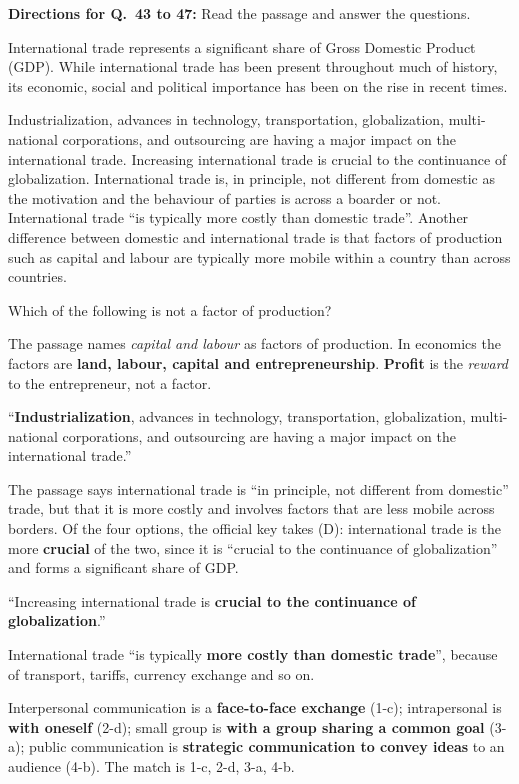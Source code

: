 \textbf{Directions for Q.~43 to 47:} Read the passage and answer the questions.\par\smallskip
International trade represents a significant share of Gross Domestic Product (GDP). While international trade has been present throughout much of history, its economic, social and political importance has been on the rise in recent times.

Industrialization, advances in technology, transportation, globalization, multi-national corporations, and outsourcing are having a major impact on the international trade. Increasing international trade is crucial to the continuance of globalization. International trade is, in principle, not different from domestic as the motivation and the behaviour of parties is across a boarder or not. International trade ``is typically more costly than domestic trade''. Another difference between domestic and international trade is that factors of production such as capital and labour are typically more mobile within a country than across countries.

Which of the following is not a factor of production?

The passage names \emph{capital and labour} as factors of production. In economics the factors are \textbf{land, labour, capital and entrepreneurship}. \textbf{Profit} is the \emph{reward} to the entrepreneur, not a factor.

``\textbf{Industrialization}, advances in technology, transportation, globalization, multi-national corporations, and outsourcing are having a major impact on the international trade.''

The passage says international trade is ``in principle, not different from domestic'' trade, but that it is more costly and involves factors that are less mobile across borders. Of the four options, the official key takes (D): international trade is the more \textbf{crucial} of the two, since it is ``crucial to the continuance of globalization'' and forms a significant share of GDP.

``Increasing international trade is \textbf{crucial to the continuance of globalization}.''

International trade ``is typically \textbf{more costly than domestic trade}'', because of transport, tariffs, currency exchange and so on.

Interpersonal communication is a \textbf{face-to-face exchange} (1-c); intrapersonal is \textbf{with oneself} (2-d); small group is \textbf{with a group sharing a common goal} (3-a); public communication is \textbf{strategic communication to convey ideas} to an audience (4-b). The match is 1-c, 2-d, 3-a, 4-b.

